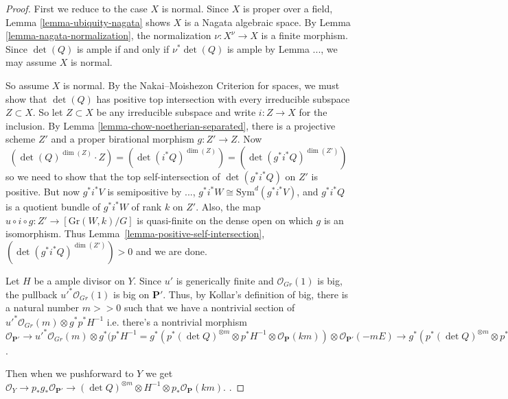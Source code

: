 \begin{proof}
First we reduce to the case $X$ is normal.
Since $X$ is proper over a field, Lemma \ref{lemma-ubiquity-nagata} shows $X$
is a Nagata algebraic space.
By Lemma \ref{lemma-nagata-normalization}, the normalization
$\nu : X^\nu \to X$ is a finite morphism.
Since $\det(Q)$ is ample if and only if $\nu^*\det(Q)$ is ample by
Lemma ..., we may
assume $X$ is normal.

So assume $X$ is normal.
By the Nakai--Moishezon Criterion for spaces,
we must show that $\det(Q)$ has positive top intersection with
every irreducible subspace $Z \subset X$.
So let $Z \subset X$ be any irreducible subspace and write $i : Z \to X$ for
the inclusion.
By Lemma \ref{lemma-chow-noetherian-separated}, there is a projective
scheme $Z'$ and a proper birational morphism $g : Z' \to Z$.
Now
$$
  (\det(Q)^{\dim(Z)} \cdot Z)
    = (\det(i^*Q)^{\dim(Z)})
    = (\det(g^*i^*Q)^{\dim(Z')})
$$
so we need to show that the top self-intersection of $\det(g^*i^*Q)$ on $Z'$
is positive.
But now $g^*i^*V$ is semipositive by ...,
$g^*i^*W \cong \mathrm{Sym}^d(g^*i^*V)$, and $g^*i^*Q$ is a
quotient bundle of $g^*i^*W$ of rank $k$ on $Z'$.
Also, the map $u \circ i \circ g : Z' \to [\mathrm{Gr}(W,k)/G]$ is quasi-finite
on the dense open on which $g$ is an isomorphism.
Thus Lemma~\ref{lemma-positive-self-intersection},
$(\det(g^*i^*Q)^{\dim(Z')}) > 0$ and we are done.
  
Let $H$ be a ample divisor on $Y$. Since $u'$ is generically finite and $\mathcal{O}_{Gr}(1)$ is big, the pullback $u'^*  \mathcal{O}_{Gr}(1)$ is big on $\mathbf{P}'$.  Thus, by Kollar's definition of big, there is a natural number $m>>0$ such that we have a nontrivial section of $u'^*\mathcal{O}_{Gr}(m)\otimes g^*p^*H^{-1}$ i.e. there's a nontrivial morphism $\mathcal{O}_{\mathbf{P}'}\to u'^*\mathcal{O}_{Gr}(m)\otimes g^*(p^*H^{-1}=g^*(p^*(\det Q)^{\otimes m}\otimes p^*H^{-1}\otimes \mathcal{O}_{\mathbf{P}}(km))\otimes \mathcal{O}_{\mathbf{P}'}(-mE)\to g^*(p^*(\det Q)^{\otimes m}\otimes p^*H^{-1}\otimes \mathcal{O}_{\mathbf{P}}(km))$. 

Then when we pushforward to $Y$ we get $\mathcal{O}_Y\to p_*g_*\mathcal{O}_{\mathbf{P}'}\to (\det Q)^{\otimes m}\otimes H^{-1}\otimes p_*\mathcal{O}_{\mathbf{P}}(km)$. .


\end{proof}
